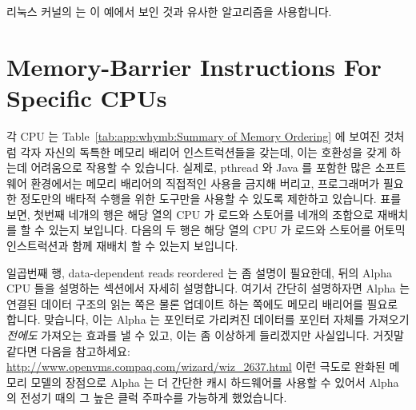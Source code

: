 리눅스 커널의  는 이 예에서 보인 것과 유사한 알고리즘을
사용합니다.

\section{Memory-Barrier Instructions For Specific CPUs}
\label{sec:app:whymb:Memory-Barrier Instructions For Specific CPUs}

각 CPU 는 Table~\ref{tab:app:whymb:Summary of Memory Ordering} 에 보여진 것처럼
각자 자신의 독특한 메모리 배리어 인스트럭션들을 갖는데, 이는 호환성을 갖게
하는데 어려움으로 작용할 수 있습니다.
실제로, pthread 와 Java 를 포함한 많은 소프트웨어 환경에서는 메모리 배리어의
직접적인 사용을 금지해 버리고, 프로그래머가 필요한 정도만의 배타적 수행을 위한
도구만을 사용할 수 있도록 제한하고 있습니다.
표를 보면, 첫번째 네개의 행은 해당 열의 CPU 가 로드와 스토어를 네개의 조합으로
재배치를 할 수 있는지 보입니다.
다음의 두 행은 해당 열의 CPU 가 로드와 스토어를 어토믹 인스트럭션과 함께 재배치
할 수 있는지 보입니다.

일곱번째 행, data-dependent reads reordered 는 좀 설명이 필요한데, 뒤의 Alpha
CPU 들을 설명하는 섹션에서 자세히 설명합니다.
여기서 간단히 설명하자면 Alpha 는 연결된 데이터 구조의 읽는 쪽은 물론 업데이트
하는 쪽에도 메모리 배리어를 필요로 합니다.
맞습니다, 이는 Alpha 는 포인터로 가리켜진 데이터를 포인터 자체를 가져오기 {\em
전에도} 가져오는 효과를 낼 수 있고, 이는 좀 이상하게 들리겠지만 사실입니다.
거짓말 같다면 다음을 참고하세요:
\url{http://www.openvms.compaq.com/wizard/wiz_2637.html}
이런 극도로 완화된 메모리 모델의 장점으로 Alpha 는 더 간단한 캐시 하드웨어를
사용할 수 있어서 Alpha 의 전성기 때의 그 높은 클럭 주파수를 가능하게
했었습니다.
\iffalse

